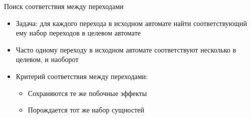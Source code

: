 \documentclass[12pt]{beamer}
\begin{document}
{
\begin{frame}{Поиск соответствия между переходами}
  \begin{mybox}[]
  \begin{itemize}
  \item Задача: для каждого перехода в исходном автомате найти соответствующий ему набор переходов в целевом автомате
  \item Часто одному переходу в исходном автомате соответствуют несколько в целевом, и наоборот
  \item Критерий соответствия между переходами:
  \begin{itemize}
 	  	\item Сохраняются те же побочные эффекты
 	  	\item Порождается тот же набор сущностей
  \end{itemize}
  \end{itemize}
  \end{mybox}
\end{frame}
}
\end{document}
